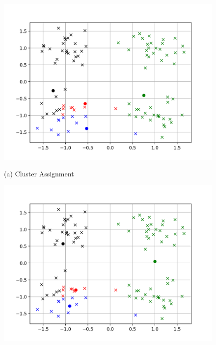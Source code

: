 \documentclass{report}
\begin{document}
\begin{figure}[t]
    \begin{minipage}{0.32\textwidth}
        \centering
        \includegraphics[width=\columnwidth]{./figures/kmeans_exp.png}

        (a) Cluster Assignment
    \end{minipage}
    \hfill
    \begin{minipage}{0.32\textwidth}
        \centering
        \includegraphics[width=\columnwidth]{./figures/kmeans_max.png}


\end{minipage}
\end{figure}
\end{document}
